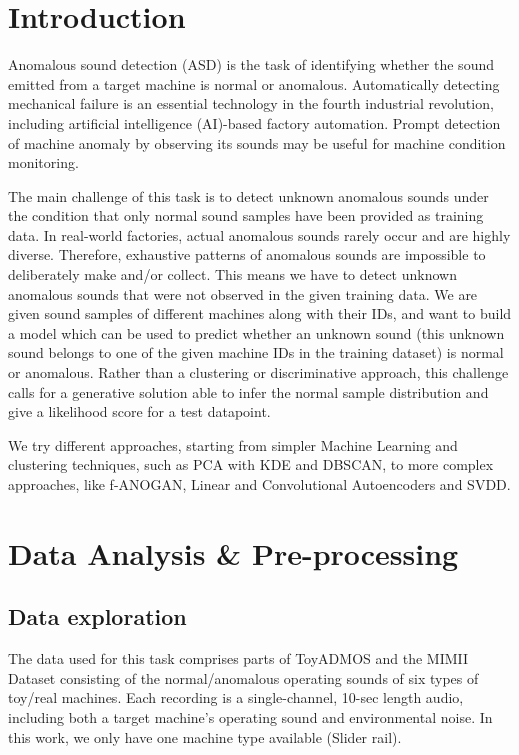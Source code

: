 \documentclass{article}
\begin{document}
	
	
\section{Introduction}


    Anomalous sound detection (ASD) is the task of identifying whether the sound emitted from a target machine is normal or anomalous. Automatically detecting mechanical failure is an essential technology in the fourth industrial revolution, including artificial intelligence (AI)-based factory automation. Prompt detection of machine anomaly by observing its sounds may be useful for machine condition monitoring.

    The main challenge of this task is to detect unknown anomalous sounds under the condition that only normal sound samples have been provided as training data. In real-world factories, actual anomalous sounds rarely occur and are highly diverse. Therefore, exhaustive patterns of anomalous sounds are impossible to deliberately make and/or collect. This means we have to detect unknown anomalous sounds that were not observed in the given training data. We are given sound samples of different machines along with their IDs, and want to build a model which can be used to predict whether an unknown sound (this unknown sound belongs to one of the given machine IDs in the training dataset) is normal or anomalous. Rather than a clustering or discriminative approach, this challenge calls for a generative solution able to infer the normal sample distribution and give a likelihood score for a test datapoint.
    
    We try different approaches, starting from simpler Machine Learning and clustering techniques, such as PCA with KDE and DBSCAN, to more complex approaches, like f-ANOGAN, Linear and Convolutional Autoencoders and SVDD.


\section{Data Analysis \& Pre-processing}
    \subsection{Data exploration}
    The data used for this task comprises parts of ToyADMOS and the MIMII Dataset consisting of the normal/anomalous operating sounds of six types of toy/real machines. Each recording is a single-channel, 10-sec length audio, including both a target machine's operating sound and environmental noise. In this work, we only have one machine type available (Slider rail). 
	
\end{document}
